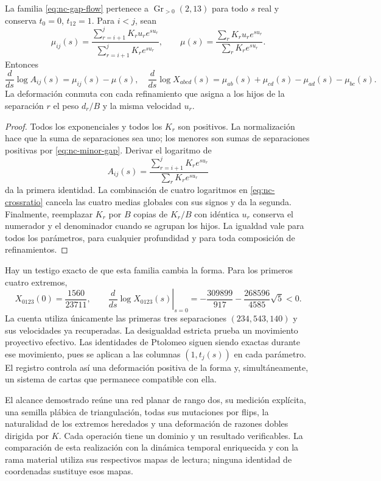 \begin{theorem}
\label{thm:nc-shape-flow}
La familia \eqref{eq:nc-gap-flow} pertenece a
\(\operatorname{Gr}_{>0}(2,13)\) para todo \(s\) real y conserva
\(t_0=0\), \(t_{12}=1\). Para \(i<j\), sean
\[
 \mu_{ij}(s)=
 \frac{\sum_{r=i+1}^jK_ru_re^{su_r}}{\sum_{r=i+1}^jK_re^{su_r}},
 \qquad
 \mu(s)=\frac{\sum_rK_ru_re^{su_r}}{\sum_rK_re^{su_r}}.
\]
Entonces
\begin{equation}
 \frac{d}{ds}\log A_{ij}(s)=\mu_{ij}(s)-\mu(s),
 \quad
 \frac{d}{ds}\log X_{abcd}(s)
 =\mu_{ab}(s)+\mu_{cd}(s)-\mu_{ad}(s)-\mu_{bc}(s).
 \label{eq:nc-crossratio-derivative}
\end{equation}
La deformación conmuta con cada refinamiento que asigna a los hijos de la
separación \(r\) el peso \(d_r/B\) y la misma velocidad \(u_r\).
\end{theorem}
\begin{proof}
Todos los exponenciales y todos los \(K_r\) son positivos. La normalización
hace que la suma de separaciones sea uno; los menores son sumas de
separaciones positivas por \eqref{eq:nc-minor-gap}. Derivar el logaritmo de
\[
 A_{ij}(s)=\frac{\sum_{r=i+1}^jK_re^{su_r}}
                      {\sum_rK_re^{su_r}}
\]
da la primera identidad. La combinación de cuatro logaritmos en
\eqref{eq:nc-crossratio} cancela las cuatro medias globales con sus signos
y da la segunda. Finalmente, reemplazar \(K_r\) por \(B\) copias de
\(K_r/B\) con idéntica \(u_r\) conserva el numerador y el denominador
cuando se agrupan los hijos. La igualdad vale para todos los parámetros,
para cualquier profundidad y para toda composición de refinamientos.
\end{proof}

Hay un testigo exacto de que esta familia cambia la forma. Para los primeros
cuatro extremos,
\begin{equation}
 X_{0123}(0)=\frac{1560}{23711},\qquad
 \left.\frac{d}{ds}\log X_{0123}(s)\right|_{s=0}
 =-\frac{309899}{917}-\frac{268596}{4585}\sqrt5<0.
 \label{eq:nc-nontrivial-witness}
\end{equation}
La cuenta utiliza únicamente las primeras tres separaciones
\((234,543,140)\) y sus velocidades ya recuperadas. La desigualdad
estricta prueba un movimiento proyectivo efectivo. Las identidades de
Ptolomeo siguen siendo exactas durante ese movimiento, pues se aplican a
las columnas \((1,t_j(s))\) en cada parámetro. El registro controla así
una deformación positiva de la forma y, simultáneamente, un sistema de
cartas que permanece compatible con ella.

El alcance demostrado reúne una red planar de rango dos, su medición
explícita, una semilla plábica de triangulación, todas sus mutaciones por
flips, la naturalidad de los extremos heredados y una deformación de
razones dobles dirigida por \(K\). Cada operación tiene un dominio y un
resultado verificables. La comparación de esta realización con la
dinámica temporal enriquecida y con la rama material utiliza sus respectivos
mapas de lectura; ninguna identidad de coordenadas sustituye esos mapas.
